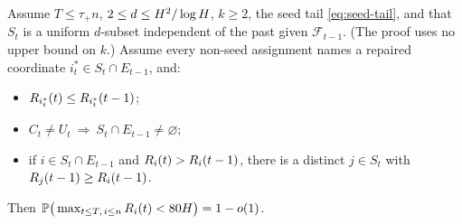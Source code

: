 \begin{lemma}\label{lem:transfer}
Assume $T\le\tau_+n$, $2\le d\le H^2/\log H$, $k\ge2$, the seed tail \eqref{eq:seed-tail}, and that $S_t$ is a
uniform $d$-subset independent of the past given $\mathcal F_{t-1}$. (The proof uses no upper bound on $k$.) Assume every non-seed assignment names a repaired
coordinate $i_t^*\in S_t\cap E_{t-1}$, and:
\begin{itemize}
  \item[\textnormal{(R1)}] $R_{i_t^*}(t)\le R_{i_t^*}(t-1)$;
  \item[\textnormal{(R2)}] $C_t\ne U_t\ \Rightarrow\ S_t\cap E_{t-1}\ne\varnothing$;
  \item[\textnormal{(R3)}] if $i\in S_t\cap E_{t-1}$ and $R_i(t)>R_i(t-1)$, there is a distinct $j\in S_t$ with
  $R_j(t-1)\ge R_i(t-1)$.
\end{itemize}
Then $\mathbb{P}\big(\max_{t\le T,\,i\le n}R_i(t)<80H\big)=1-o(1)$.
\end{lemma}

